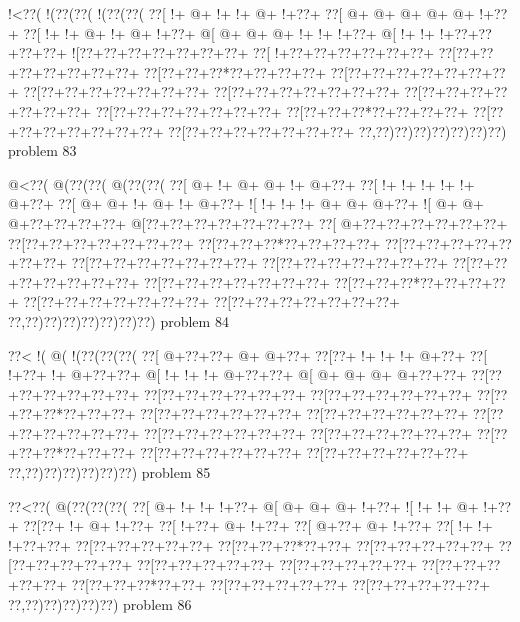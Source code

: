 \vbox{\vbox{\goo
\- !<\0??(\- !(\0??(\0??(\- !(\0??(\0??(
\0??[\- !+\- @+\- !+\- !+\- @+\- !+\0??+
\0??[\- @+\- @+\- @+\- @+\- @+\- !+\0??+
\0??[\- !+\- !+\- @+\- !+\- @+\- !+\0??+
\- @[\- @+\- @+\- @+\- !+\- !+\- !+\0??+
\- @[\- !+\- !+\- !+\0??+\0??+\0??+\0??+
\- ![\0??+\0??+\0??+\0??+\0??+\0??+\0??+
\0??[\- !+\0??+\0??+\0??+\0??+\0??+\0??+
\0??[\0??+\0??+\0??+\0??+\0??+\0??+\0??+
\0??[\0??+\0??+\0??*\0??+\0??+\0??+\0??+
\0??[\0??+\0??+\0??+\0??+\0??+\0??+\0??+
\0??[\0??+\0??+\0??+\0??+\0??+\0??+\0??+
\0??[\0??+\0??+\0??+\0??+\0??+\0??+\0??+
\0??[\0??+\0??+\0??+\0??+\0??+\0??+\0??+
\0??[\0??+\0??+\0??+\0??+\0??+\0??+\0??+
\0??[\0??+\0??+\0??*\0??+\0??+\0??+\0??+
\0??[\0??+\0??+\0??+\0??+\0??+\0??+\0??+
\0??[\0??+\0??+\0??+\0??+\0??+\0??+\0??+
\0??,\0??)\0??)\0??)\0??)\0??)\0??)\0??)
}
\hfil problem 83\hfil\break
}

\vbox{\vbox{\goo
\- @<\0??(\- @(\0??(\0??(\- @(\0??(\0??(
\0??[\- @+\- !+\- @+\- @+\- !+\- @+\0??+
\0??[\- !+\- !+\- !+\- !+\- !+\- @+\0??+
\0??[\- @+\- @+\- !+\- @+\- !+\- @+\0??+
\- ![\- !+\- !+\- !+\- @+\- @+\- @+\0??+
\- ![\- @+\- @+\- @+\0??+\0??+\0??+\0??+
\- @[\0??+\0??+\0??+\0??+\0??+\0??+\0??+
\0??[\- @+\0??+\0??+\0??+\0??+\0??+\0??+
\0??[\0??+\0??+\0??+\0??+\0??+\0??+\0??+
\0??[\0??+\0??+\0??*\0??+\0??+\0??+\0??+
\0??[\0??+\0??+\0??+\0??+\0??+\0??+\0??+
\0??[\0??+\0??+\0??+\0??+\0??+\0??+\0??+
\0??[\0??+\0??+\0??+\0??+\0??+\0??+\0??+
\0??[\0??+\0??+\0??+\0??+\0??+\0??+\0??+
\0??[\0??+\0??+\0??+\0??+\0??+\0??+\0??+
\0??[\0??+\0??+\0??*\0??+\0??+\0??+\0??+
\0??[\0??+\0??+\0??+\0??+\0??+\0??+\0??+
\0??[\0??+\0??+\0??+\0??+\0??+\0??+\0??+
\0??,\0??)\0??)\0??)\0??)\0??)\0??)\0??)
}
\hfil problem 84\hfil\break
}

\vbox{\vbox{\goo
\0??<\- !(\- @(\- !(\0??(\0??(\0??(
\0??[\- @+\0??+\0??+\- @+\- @+\0??+
\0??[\0??+\- !+\- !+\- !+\- @+\0??+
\0??[\- !+\0??+\- !+\- @+\0??+\0??+
\- @[\- !+\- !+\- !+\- @+\0??+\0??+
\- @[\- @+\- @+\- @+\- @+\0??+\0??+
\0??[\0??+\0??+\0??+\0??+\0??+\0??+
\0??[\0??+\0??+\0??+\0??+\0??+\0??+
\0??[\0??+\0??+\0??+\0??+\0??+\0??+
\0??[\0??+\0??+\0??*\0??+\0??+\0??+
\0??[\0??+\0??+\0??+\0??+\0??+\0??+
\0??[\0??+\0??+\0??+\0??+\0??+\0??+
\0??[\0??+\0??+\0??+\0??+\0??+\0??+
\0??[\0??+\0??+\0??+\0??+\0??+\0??+
\0??[\0??+\0??+\0??+\0??+\0??+\0??+
\0??[\0??+\0??+\0??*\0??+\0??+\0??+
\0??[\0??+\0??+\0??+\0??+\0??+\0??+
\0??[\0??+\0??+\0??+\0??+\0??+\0??+
\0??,\0??)\0??)\0??)\0??)\0??)\0??)
}
\hfil problem 85\hfil\break
}

\vbox{\vbox{\goo
\0??<\0??(\- @(\0??(\0??(\0??(
\0??[\- @+\- !+\- !+\- !+\0??+
\- @[\- @+\- @+\- @+\- !+\0??+
\- ![\- !+\- !+\- @+\- !+\0??+
\0??[\0??+\- !+\- @+\- !+\0??+
\0??[\- !+\0??+\- @+\- !+\0??+
\0??[\- @+\0??+\- @+\- !+\0??+
\0??[\- !+\- !+\- !+\0??+\0??+
\0??[\0??+\0??+\0??+\0??+\0??+
\0??[\0??+\0??+\0??*\0??+\0??+
\0??[\0??+\0??+\0??+\0??+\0??+
\0??[\0??+\0??+\0??+\0??+\0??+
\0??[\0??+\0??+\0??+\0??+\0??+
\0??[\0??+\0??+\0??+\0??+\0??+
\0??[\0??+\0??+\0??+\0??+\0??+
\0??[\0??+\0??+\0??*\0??+\0??+
\0??[\0??+\0??+\0??+\0??+\0??+
\0??[\0??+\0??+\0??+\0??+\0??+
\0??,\0??)\0??)\0??)\0??)\0??)
}
\hfil problem 86\hfil\break
}

